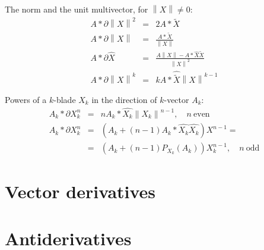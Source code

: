 \documentclass[a4paper,12pt]{article}
\newcommand{\reverse}[1]{\tilde{#1}} %
\providecommand{\norm}[1]{\left\lVert#1\right\rVert}
\providecommand{\normed}[1]{\hat{#1}}
\begin{document}
The norm and the unit multivector, for $\norm{X} \neq 0$:
\begin{eqnarray}
A * \partial \norm{X}^2 &=& 2 A * \reverse{X}\\
A * \partial \norm{X} &=& \frac{A * \reverse{X}}{\norm{X}}\\
A * \partial \normed{X} &=& \frac{A \norm{X} - A * \normed{X} \reverse{X}}{\norm{X}^2}\\
A * \partial \norm{X}^k &=& k A * \normed{\reverse{X}} \norm{X}^{k-1}
\end{eqnarray}

Powers of a $k$-blade $X_k$ in the direction of $k$-vector $A_k$:
\begin{eqnarray}
A_k * \partial X_k^n &=& n A_k * \normed{X_k} \norm{X_k}^{n-1},\quad n\ \mathrm{even}\\
A_k * \partial X_k^n &=& \left(A_k + (n-1) A_k*\normed{X_k}\normed{X_k}\right) X^{n-1}
=\nonumber\\
&=& \left(A_k + (n-1) P_{X_k}(A_k)\right) X_k^{n-1},\quad n\ \mathrm{odd}
\end{eqnarray}

\section{Vector derivatives}

\section{Antiderivatives}


\printbibliography[heading=bibintoc, title={References}]
\end{document}
